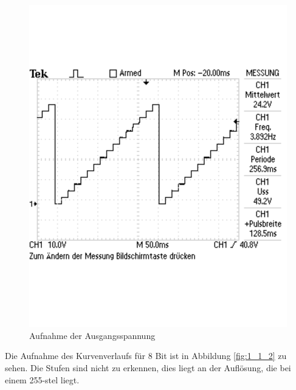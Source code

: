 \documentclass[12pt,a4paper]{article}
\begin{document}
\begin{figure}[H] 
  \centering 	
    \includegraphics[trim = 0mm 50mm 0mm 50mm, clip, scale = 0.4]{1_1_1.pdf}
  	\caption[Aufnahme der Ausgangsspannung]{Aufnahme der Ausgangsspannung} 
  \label{fig:1_1_1}
\end{figure}

Die Aufnahme des Kurvenverlaufs für 8 Bit ist in Abbildung \ref{fig:1_1_2} zu sehen. Die Stufen sind nicht zu erkennen, dies liegt an der Auflösung, die bei einem 255-stel liegt.
\end{document}
